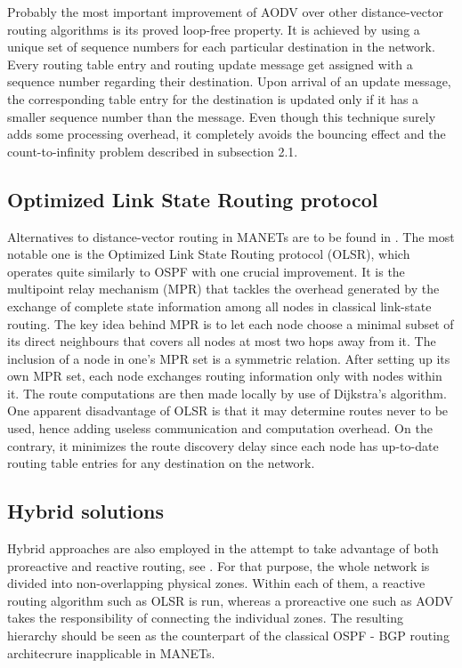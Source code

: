 \documentclass{acm_proc_article-sp}
\begin{document}
Probably the most important improvement of AODV over other distance-vector routing algorithms is its proved loop-free property. It is achieved by using a unique set of sequence numbers for each particular destination in the network. Every routing table entry and routing update message get assigned with a sequence number regarding their destination. Upon arrival of an update message, the corresponding table entry for the destination is updated only if it has a smaller sequence number than the message. Even though this technique surely adds some processing overhead, it completely avoids the bouncing effect and the count-to-infinity problem described in subsection 2.1. 

\subsection{Optimized Link State Routing protocol}

Alternatives to distance-vector routing in MANETs are to be found in \cite{holter}. The most notable one is the Optimized Link State Routing protocol (OLSR), which operates quite similarly to OSPF with one crucial improvement. It is the multipoint relay mechanism (MPR) that tackles the overhead generated by the exchange of complete state information among all nodes in classical link-state routing. The key idea behind MPR is to let each node choose a minimal subset of its direct neighbours that covers all nodes at most two hops away from it. The inclusion of a node in one's MPR set is a symmetric relation. After setting up its own MPR set, each node exchanges routing information only with nodes within it. The route computations are then made locally by use of Dijkstra's algorithm. One apparent disadvantage of OLSR is that it may determine routes never to be used, hence adding useless communication and computation overhead. On the contrary, it minimizes the route discovery delay since each node has up-to-date routing table entries for any destination on the network. 

\subsection{Hybrid solutions}
Hybrid approaches are also employed in the attempt to take advantage of both proreactive and reactive routing, see \cite{haas}. For that purpose, the whole network is divided into non-overlapping physical zones. Within each of them, a reactive routing algorithm such as OLSR is run, whereas a proreactive one such as AODV takes the responsibility of connecting the individual zones. The resulting hierarchy should be seen as the counterpart of the classical OSPF - BGP routing architecrure inapplicable in MANETs.
\end{document}
